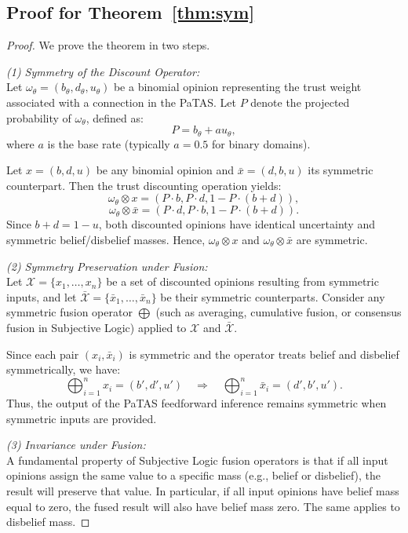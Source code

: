 \subsection{Proof for Theorem~\ref{thm:sym}}
\begin{proof}
We prove the theorem in two steps.

\emph{(1) Symmetry of the Discount Operator:} \\
Let $\omega_\theta = (b_\theta, d_\theta, u_\theta)$ be a binomial opinion representing the trust weight associated with a connection in the PaTAS. Let $P$ denote the projected probability of $\omega_\theta$, defined as:
\[
P = b_\theta + a u_\theta,
\]
where $a$ is the base rate (typically $a = 0.5$ for binary domains).

Let $x = (b, d, u)$ be any binomial opinion and $\bar{x} = (d, b, u)$ its symmetric counterpart. Then the trust discounting operation yields:
\[
\omega_\theta \otimes x = (P \cdot b, P \cdot d, 1 - P \cdot (b + d)),
\]
\[
\omega_\theta \otimes \bar{x} = (P \cdot d, P \cdot b, 1 - P \cdot (b + d)).
\]
Since $b + d = 1 - u$, both discounted opinions have identical uncertainty and symmetric belief/disbelief masses. Hence, $\omega_\theta \otimes x$ and $\omega_\theta \otimes \bar{x}$ are symmetric.

\emph{(2) Symmetry Preservation under Fusion:} \\
Let $\mathcal{X} = \{x_1, \dots, x_n\}$ be a set of discounted opinions resulting from symmetric inputs, and let $\bar{\mathcal{X}} = \{\bar{x}_1, \dots, \bar{x}_n\}$ be their symmetric counterparts. Consider any symmetric fusion operator $\bigoplus$ (such as averaging, cumulative fusion, or consensus fusion in Subjective Logic) applied to $\mathcal{X}$ and $\bar{\mathcal{X}}$.

Since each pair $(x_i, \bar{x}_i)$ is symmetric and the operator treats belief and disbelief symmetrically, we have:
\[
\bigoplus_{i=1}^n x_i = (b', d', u') \quad \Rightarrow \quad \bigoplus_{i=1}^n \bar{x}_i = (d', b', u').
\]
Thus, the output of the PaTAS feedforward inference remains symmetric when symmetric inputs are provided.

\emph{(3) Invariance under Fusion:} \\
A fundamental property of Subjective Logic fusion operators is that if all input opinions assign the same value to a specific mass (e.g., belief or disbelief), the result will preserve that value. In particular, if all input opinions have belief mass equal to zero, the fused result will also have belief mass zero. The same applies to disbelief mass.


\end{proof}
